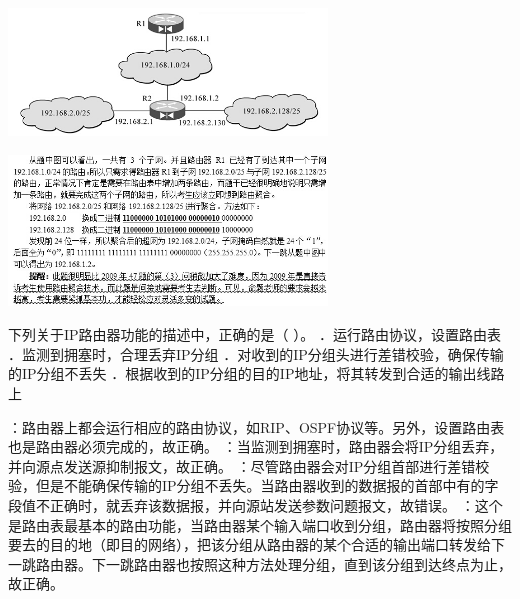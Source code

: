 \includegraphics[width=3.33333in,height=1.33333in]{computerassets/68bb6dada2bc1a91fdc323c08ef13460.jpeg}
\par{}
\begin{solution}\includegraphics[width=3.33333in,height=1.58333in]{computerassets/587e0809d07702794990cae26f6745b2.jpeg}
\end{solution}
\question 下列关于IP路由器功能的描述中，正确的是（ ）。
．运行路由协议，设置路由表 ．监测到拥塞时，合理丢弃IP分组
．对收到的IP分组头进行差错校验，确保传输的IP分组不丢失
．根据收到的IP分组的目的IP地址，将其转发到合适的输出线路上
\par{}
\begin{solution}：路由器上都会运行相应的路由协议，如RIP、OSPF协议等。另外，设置路由表也是路由器必须完成的，故正确。
：当监测到拥塞时，路由器会将IP分组丢弃，并向源点发送源抑制报文，故正确。
：尽管路由器会对IP分组首部进行差错校验，但是不能确保传输的IP分组不丢失。当路由器收到的数据报的首部中有的字段值不正确时，就丢弃该数据报，并向源站发送参数问题报文，故错误。
：这个是路由表最基本的路由功能，当路由器某个输入端口收到分组，路由器将按照分组要去的目的地（即目的网络），把该分组从路由器的某个合适的输出端口转发给下一跳路由器。下一跳路由器也按照这种方法处理分组，直到该分组到达终点为止，故正确。
\end{solution}
